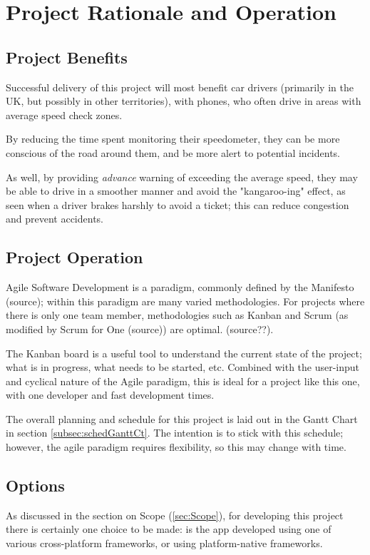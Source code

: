 \documentclass[11pt, a4paper, notitlepage]{report}
\begin{document}
\chapter{Project Rationale and Operation}
\section{Project Benefits}
Successful delivery of this project will most benefit car drivers (primarily in 
the UK, but possibly in other territories), with phones, who often drive in 
areas with average speed check zones. 

By reducing the time spent monitoring their speedometer, they can be more 
conscious of the road around them, and be more alert to potential incidents.

As well, by providing \textit{advance} warning of exceeding the average speed, 
they may be able to drive in a smoother manner and avoid the "kangaroo-ing" 
effect, as seen when a driver brakes harshly to avoid a ticket; this can reduce 
congestion and prevent accidents.

\section{Project Operation}\label{sec:projectOperation}
Agile Software Development is a paradigm, commonly defined by the Manifesto 
(source); within this paradigm are many varied methodologies. For projects 
where there is only one team member, methodologies such as Kanban and Scrum (as 
modified by Scrum for One (source)) are optimal. (source??).

The Kanban board is a useful tool to understand the current state of the 
project; what is in progress, what needs to be started, etc. Combined with the 
user-input and cyclical nature of the Agile paradigm, this is ideal for a 
project like this one, with one developer and fast development times.

The overall planning and schedule for this project is laid out in the Gantt 
Chart in section \ref{subsec:schedGanttCt}. The intention is to stick with this 
schedule; however, the agile paradigm requires flexibility, so this may change 
with time.

\section{Options}
As discussed in the section on Scope (\ref{sec:Scope}), for developing this 
project there is certainly one choice to be made: is the app developed using 
one of various cross-platform frameworks, or using platform-native frameworks.
\end{document}
